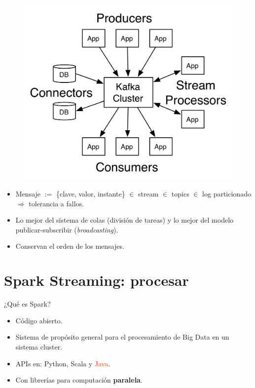 \documentclass[dvipsnames]{beamer}
\begin{document}
	\begin{frame}
          \begin{figure}[H]
            \centering
            \includegraphics[scale=0.7]{img/kafka-apis.png}
          \end{figure}
          \begin{itemize}
          \item Mensaje $:=$ \{clave, valor, instante\} $\in$ stream $\in$ topics $\in$ log particionado $\Rightarrow$ \textcolor{deepRed}{tolerancia a fallos}.
          \item Lo mejor del sistema de colas (división de tareas) y lo mejor del modelo publicar-subscribir (\textit{broadcasting}).
          \item Conservan el orden de los mensajes.
          \end{itemize}
	\end{frame}
	
	\section{Spark Streaming: procesar}
	
	\begin{frame}
          ¿Qué es Spark?
          \begin{itemize}
          \item Código abierto.
          \item Sistema de propósito general para el procesamiento de Big Data en un sistema cluster.
          \item APIs en: \textcolor{deepBlue}{Python}, \textcolor{deepRed}{Scala} y \textcolor{orangeRed}{Java}.
          \item Con librerías para computación \textbf{paralela}.
          \end{itemize}
	\end{frame}	
	
\end{document}
